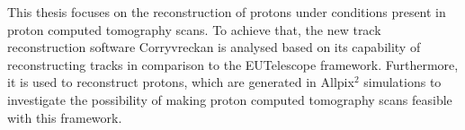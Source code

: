 This thesis focuses on the reconstruction of protons under conditions present in proton computed tomography scans. To achieve that, the new track reconstruction software
Corryvreckan is analysed based on its capability of reconstructing tracks in comparison to the EUTelescope framework. Furthermore, it is used to reconstruct
protons, which are generated in Allpix$^2$ simulations to investigate the possibility of making proton computed tomography scans feasible with this framework.




%
